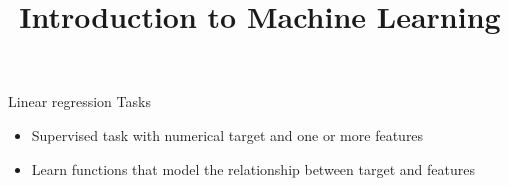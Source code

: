 \documentclass[11pt,compress,t,notes=noshow, xcolor=table]{beamer}
\title{Introduction to Machine Learning}
\institute{\href{https://compstat-lmu.github.io/lecture_i2ml/}{compstat-lmu.github.io/lecture\_i2ml}}
\date{}
\begin{document}



\begin{vbframe}{Linear regression Tasks}

\begin{itemize}
    \item Supervised task with numerical target and one or more features
    \item Learn functions that model the relationship between target and features

\end{itemize}

\end{vbframe} 

\end{document}
